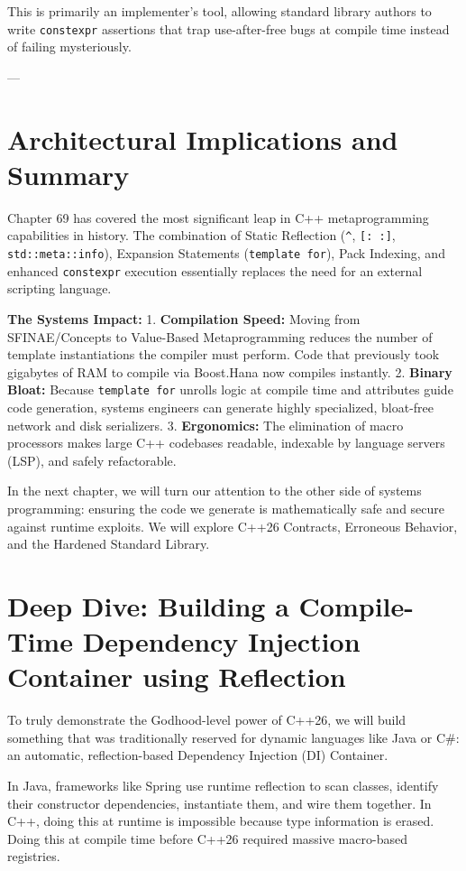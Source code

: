 This is primarily an implementer's tool, allowing standard library authors to write \texttt{constexpr} assertions that trap use-after-free bugs at compile time instead of failing mysteriously.

---

\section{Architectural Implications and Summary}

Chapter 69 has covered the most significant leap in C++ metaprogramming capabilities in history. The combination of Static Reflection (\texttt{^}, \texttt{[: :]}, \texttt{std::meta::info}), Expansion Statements (\texttt{template for}), Pack Indexing, and enhanced \texttt{constexpr} execution essentially replaces the need for an external scripting language.

\textbf{The Systems Impact:}
1. \textbf{Compilation Speed:} Moving from SFINAE/Concepts to Value-Based Metaprogramming reduces the number of template instantiations the compiler must perform. Code that previously took gigabytes of RAM to compile via Boost.Hana now compiles instantly.
2. \textbf{Binary Bloat:} Because \texttt{template for} unrolls logic at compile time and attributes guide code generation, systems engineers can generate highly specialized, bloat-free network and disk serializers.
3. \textbf{Ergonomics:} The elimination of macro processors makes large C++ codebases readable, indexable by language servers (LSP), and safely refactorable.

In the next chapter, we will turn our attention to the other side of systems programming: ensuring the code we generate is mathematically safe and secure against runtime exploits. We will explore C++26 Contracts, Erroneous Behavior, and the Hardened Standard Library.

\section{Deep Dive: Building a Compile-Time Dependency Injection Container using Reflection}

To truly demonstrate the Godhood-level power of C++26, we will build something that was traditionally reserved for dynamic languages like Java or C#: an automatic, reflection-based Dependency Injection (DI) Container. 

In Java, frameworks like Spring use runtime reflection to scan classes, identify their constructor dependencies, instantiate them, and wire them together. In C++, doing this at runtime is impossible because type information is erased. Doing this at compile time before C++26 required massive macro-based registries.

